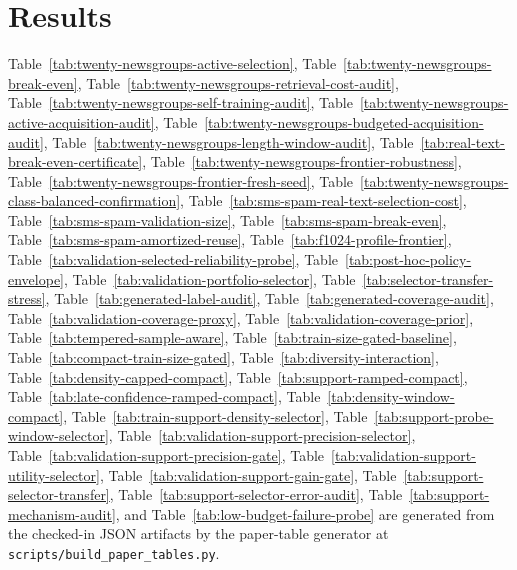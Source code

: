\documentclass[11pt]{article}
\begin{document}
\section{Results}

Table~\ref{tab:twenty-newsgroups-active-selection},
Table~\ref{tab:twenty-newsgroups-break-even},
Table~\ref{tab:twenty-newsgroups-retrieval-cost-audit},
Table~\ref{tab:twenty-newsgroups-self-training-audit},
Table~\ref{tab:twenty-newsgroups-active-acquisition-audit},
Table~\ref{tab:twenty-newsgroups-budgeted-acquisition-audit},
Table~\ref{tab:twenty-newsgroups-length-window-audit},
Table~\ref{tab:real-text-break-even-certificate},
Table~\ref{tab:twenty-newsgroups-frontier-robustness},
Table~\ref{tab:twenty-newsgroups-frontier-fresh-seed},
Table~\ref{tab:twenty-newsgroups-class-balanced-confirmation},
Table~\ref{tab:sms-spam-real-text-selection-cost},
Table~\ref{tab:sms-spam-validation-size},
Table~\ref{tab:sms-spam-break-even},
Table~\ref{tab:sms-spam-amortized-reuse},
Table~\ref{tab:f1024-profile-frontier},
Table~\ref{tab:validation-selected-reliability-probe},
Table~\ref{tab:post-hoc-policy-envelope},
Table~\ref{tab:validation-portfolio-selector},
Table~\ref{tab:selector-transfer-stress},
Table~\ref{tab:generated-label-audit},
Table~\ref{tab:generated-coverage-audit},
Table~\ref{tab:validation-coverage-proxy},
Table~\ref{tab:validation-coverage-prior},
Table~\ref{tab:tempered-sample-aware},
Table~\ref{tab:train-size-gated-baseline},
Table~\ref{tab:compact-train-size-gated},
Table~\ref{tab:diversity-interaction},
Table~\ref{tab:density-capped-compact},
Table~\ref{tab:support-ramped-compact},
Table~\ref{tab:late-confidence-ramped-compact},
Table~\ref{tab:density-window-compact},
Table~\ref{tab:train-support-density-selector},
Table~\ref{tab:support-probe-window-selector},
Table~\ref{tab:validation-support-precision-selector},
Table~\ref{tab:validation-support-precision-gate},
Table~\ref{tab:validation-support-utility-selector},
Table~\ref{tab:validation-support-gain-gate},
Table~\ref{tab:support-selector-transfer},
Table~\ref{tab:support-selector-error-audit},
Table~\ref{tab:support-mechanism-audit}, and
Table~\ref{tab:low-budget-failure-probe} are generated from the checked-in JSON
artifacts by the paper-table generator at
\texttt{scripts/build\_\allowbreak paper\_\allowbreak tables.py}.


\end{document}
